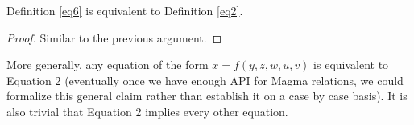 \begin{theorem}[6 equivalent to 2]\label{6_equiv_2}\leanok  Definition \ref{eq6} is equivalent to Definition \ref{eq2}.
\end{theorem}

\begin{proof}  Similar to the previous argument.
\end{proof}

More generally, any equation of the form $x = f(y,z,w,u,v)$ is equivalent to Equation 2 (eventually once we have enough API for Magma relations, we could formalize this general claim rather than establish it on a case by case basis).  It is also trivial that Equation 2 implies every other equation.
